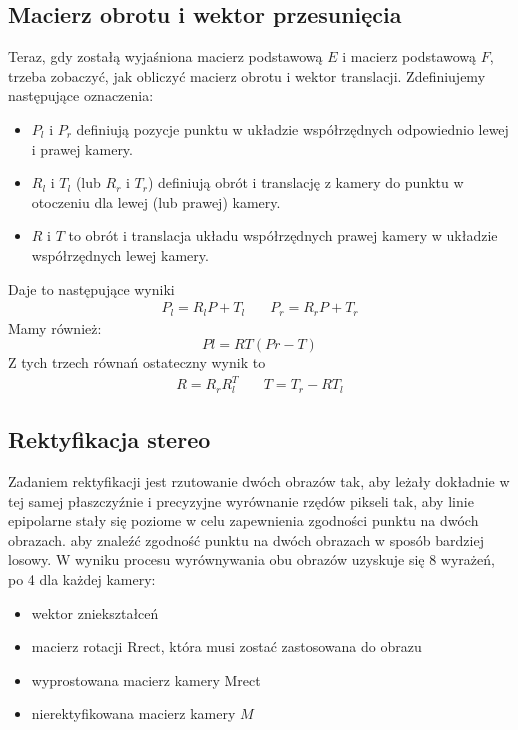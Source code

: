 \documentclass[magisterska]{pracadypl}
\begin{document}
\subsection{Macierz obrotu i wektor przesunięcia}

Teraz, gdy zostałą wyjaśniona macierz podstawową $E$ i macierz podstawową $F$, trzeba zobaczyć, jak obliczyć macierz obrotu i wektor translacji.
Zdefiniujemy następujące oznaczenia:

\begin{itemize}
  \item $P_l$ i $P_r$ definiują pozycje punktu w układzie współrzędnych odpowiednio lewej i prawej kamery.
  \item $R_l$ i $T_l$ (lub $R_r$ i $T_r$) definiują obrót i translację z kamery
do punktu w otoczeniu dla lewej (lub prawej) kamery.
  \item $R$ i $T$ to obrót i translacja układu współrzędnych prawej kamery w układzie współrzędnych lewej kamery.
\end{itemize}

Daje to następujące wyniki
\[
\begin{array}{cc}
P_l = R_l P + T_l & \quad P_r = R_r P + T_r
\end{array}
\]
Mamy również:
\[Pl=RT(Pr-T)\]
Z tych trzech równań ostateczny wynik to
\[
\begin{array}{cc}
R = R_r R_l^T & \quad T = T_r - R T_l
\end{array}
\]

\subsection{Rektyfikacja stereo}

Zadaniem rektyfikacji jest rzutowanie dwóch obrazów tak, aby leżały dokładnie w tej samej płaszczyźnie i precyzyjne wyrównanie rzędów pikseli tak, aby linie epipolarne stały się poziome w celu zapewnienia zgodności punktu na dwóch obrazach.
aby znaleźć zgodność punktu na dwóch obrazach w sposób bardziej losowy.
W wyniku procesu wyrównywania obu obrazów uzyskuje się 8 wyrażeń, po 4 dla każdej kamery:

\begin{itemize}
  \item wektor zniekształceń
  \item macierz rotacji Rrect, która musi zostać zastosowana do obrazu
  \item wyprostowana macierz kamery Mrect
  \item nierektyfikowana macierz kamery $M$
\end{itemize}
\end{document}
